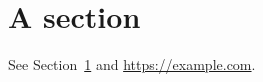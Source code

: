 \documentclass{article}
\begin{document}
\section{A section}\label{s}
See Section~\ref{s} and \url{https://example.com}.
\end{document}
